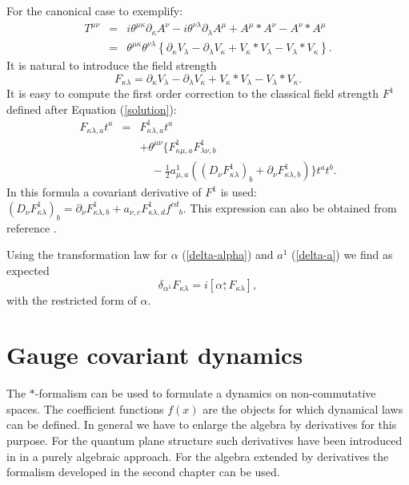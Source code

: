 \documentclass[a4paper,11pt]{article}
\newcommand{\newsection}{ \setcounter{equation}{0} \section}
\def\nn{\nonumber }
\def\la{\lambda}
\def\ka{\kappa}
\def\ds{\stackrel{*}{,}}
\def\pat{\partial}
\begin{document}
For the canonical case to exemplify:
\begin{eqnarray}
  T^{\mu\nu}&=&i\theta^{\mu\ka}\pat_{\ka}A^{\nu}-i\theta^{\nu\la}\pat_{\la}A^{\mu}+A^{\mu}*A^{\nu}-A^{\nu}*A^{\mu}\nn\\
  &=&\theta^{\mu\ka}\theta^{\nu\la}\left\{\pat_{\ka}V_{\la}-\pat_{\la}V_{\ka}+V_{\ka}*V_{\la}-V_{\la}*V_{\ka}\right\}.
\end{eqnarray}
It is natural to introduce the field strength
\begin{equation}
\label{field-str}
  F_{\ka\la}=\pat_{\ka}V_{\la}-\pat_{\la}V_{\ka}+V_{\ka}*V_{\la}-V_{\la}*V_{\ka}.
\end{equation}
It is easy to compute the first order correction to the classical field strength 
$F^1$ defined after Equation (\ref{solution}):
\begin{eqnarray}
\label{field-str-correction}
  F_{\ka\la,a}t^a&=&F^1_{\ka\la,a}t^a\nn\\
  &&+\theta^{\mu\nu}\Big\{F^1_{\ka\mu,a}F^1_{\la\nu,b}\nn\\
  &&\quad-\frac{1}{2}a^1_{\mu,a}\left((D_{\nu}F^1_{\ka\la})_b+\pat_{\nu}F^1_{\ka\la,b}\right)\Big\}t^at^b.
\end{eqnarray}
In this formula a covariant derivative of $F^1$ is used: $(D_{\nu}F^1_{\ka\la})_b=\pat_{\nu}F^1_{\ka\la,b}+a_{\nu,c}F^1_{\ka\la,d}f^{cd}{}_b$.
This expression can also be obtained from reference \cite{SW}. 

Using the transformation law for $\alpha$ (\ref{delta-alpha}) and $a^1$ (\ref{delta-a}) 
we find as expected 
\begin{equation}
  \delta_{\alpha^1}F_{\ka\la}=i[\alpha\ds F_{\ka\la}], 
\end{equation}
with the restricted form of $\alpha$.


\newsection{Gauge covariant dynamics}
\label{dynamics}

The $*$-formalism can be used to formulate a dynamics on non-commutative spaces. 
The coefficient functions $f(x)$ are the objects for which dynamical laws can be 
defined. In general we have to enlarge the algebra by derivatives for this purpose. 
For the quantum plane structure such derivatives have been introduced in \cite{WZ} 
in a purely algebraic approach. For the algebra extended by derivatives the formalism 
developed in the second chapter can be used. 
\end{document}
